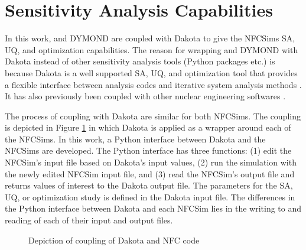 \section{Sensitivity Analysis Capabilities}
In this work, \Cyclus and DYMOND are coupled with Dakota 
\cite{eldred_dakota_2010} to give the \glspl{NFCSim} \gls{SA}, 
\gls{UQ}, and optimization capabilities. 
The reason for wrapping \Cyclus and DYMOND with Dakota instead of 
other sensitivity analysis tools (Python packages etc.)
is because Dakota is a well supported \gls{SA}, \gls{UQ}, 
and optimization tool that provides a flexible interface between 
analysis codes and iterative system analysis methods 
\cite{turner_virtual_nodate}. 
It has also previously been coupled with other nuclear engineering 
softwares \cite{turner_virtual_nodate,zhang_uncertainty_nodate}. 

The process of coupling with Dakota are similar 
for both \glspl{NFCSim}. 
The coupling is depicted in Figure \ref{fig:dakota-NFC-flow} in which 
Dakota is applied as a wrapper around each of the \glspl{NFCSim}. 
In this work, a Python interface between Dakota and the \glspl{NFCSim}
are developed. 
The Python interface has three functions: 
(1) edit the \gls{NFCSim}'s input file based on Dakota's input values, 
(2) run the simulation with the newly edited \gls{NFCSim} input file, and 
(3) read the \gls{NFCSim}'s output file and returns values of interest 
to the Dakota output file. 
The parameters for the \gls{SA}, \gls{UQ}, or optimization study 
is defined in the Dakota input file. 
The differences in the Python interface between Dakota and each 
\gls{NFCSim} lies in the writing to and reading of 
each of their input and output files. 

\begin{figure}[]
    \centering
    \caption{Depiction of coupling of Dakota and NFC code}
    \label{fig:dakota-NFC-flow}
\end{figure}


